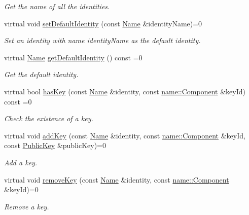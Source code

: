\begin{DoxyCompactItemize}
\begin{DoxyCompactList}\small\item\em Get the name of all the identities. \end{DoxyCompactList}\item 
virtual void \hyperlink{classndn_1_1security_1_1PibImpl_a73e6e0b49efeafae5763070d4f9f9fb3}{set\+Default\+Identity} (const \hyperlink{classndn_1_1Name}{Name} \&identity\+Name)=0
\begin{DoxyCompactList}\small\item\em Set an identity with name {\ttfamily identity\+Name} as the default identity. \end{DoxyCompactList}\item 
virtual \hyperlink{classndn_1_1Name}{Name} \hyperlink{classndn_1_1security_1_1PibImpl_a32b82e06403bc231e84d8b4ea7812cbe}{get\+Default\+Identity} () const =0
\begin{DoxyCompactList}\small\item\em Get the default identity. \end{DoxyCompactList}\item 
virtual bool \hyperlink{classndn_1_1security_1_1PibImpl_a4b3940f03ec40c8c96b4978961da4655}{has\+Key} (const \hyperlink{classndn_1_1Name}{Name} \&identity, const \hyperlink{classndn_1_1name_1_1Component}{name\+::\+Component} \&key\+Id) const =0
\begin{DoxyCompactList}\small\item\em Check the existence of a key. \end{DoxyCompactList}\item 
virtual void \hyperlink{classndn_1_1security_1_1PibImpl_a38647f91826e1a771c6c19e4d391145d}{add\+Key} (const \hyperlink{classndn_1_1Name}{Name} \&identity, const \hyperlink{classndn_1_1name_1_1Component}{name\+::\+Component} \&key\+Id, const \hyperlink{classndn_1_1PublicKey}{Public\+Key} \&public\+Key)=0
\begin{DoxyCompactList}\small\item\em Add a key. \end{DoxyCompactList}\item 
virtual void \hyperlink{classndn_1_1security_1_1PibImpl_a66dc209a194383f9bc91ac14c0e6ff6c}{remove\+Key} (const \hyperlink{classndn_1_1Name}{Name} \&identity, const \hyperlink{classndn_1_1name_1_1Component}{name\+::\+Component} \&key\+Id)=0
\begin{DoxyCompactList}\small\item\em Remove a key. \end{DoxyCompactList}\item 

\end{DoxyCompactItemize}
